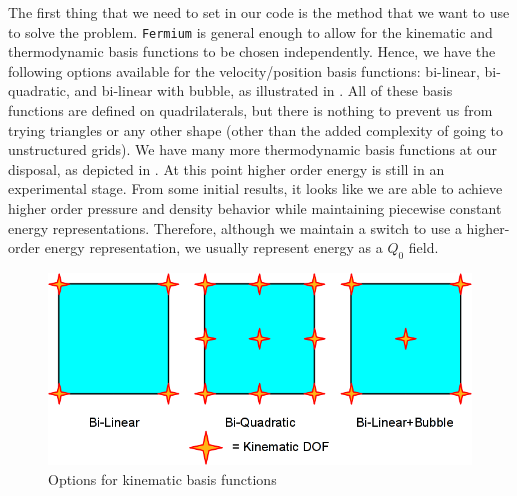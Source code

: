 The first thing that we need to set in our code is the method that we want to use to solve the problem. \texttt{Fermium} is general enough to allow for the kinematic and thermodynamic basis functions to be chosen independently. Hence, we have the following options available for the velocity/position basis functions: bi-linear, bi-quadratic, and bi-linear with bubble, as illustrated in . All of these basis functions are defined on quadrilaterals, but there is nothing to prevent us from trying triangles or any other shape (other than the added complexity of going to unstructured grids). We have many more thermodynamic basis functions at our disposal, as depicted in . At this point higher order energy is still in an experimental stage. From some initial results, it looks like we are able to achieve higher order pressure and density behavior while maintaining piecewise constant energy representations. Therefore, although we maintain a switch to use a higher-order energy representation, we usually represent energy as a $Q_0$ field.

\begin{figure}[p!]
 \centering
 \includegraphics[width=6in,keepaspectratio=true]{./Figures/VelBasisFunctions.png}
 \caption{Options for kinematic basis functions}
 \label{fig:VelBasisFunctions}
\end{figure}

